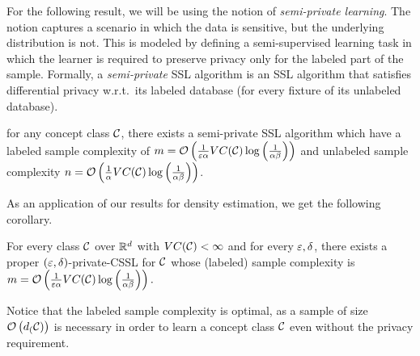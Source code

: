 \documentclass[12pt,a4paper,oneside,onecolumn]{book}
\begin{document}
For the following result, we will be using the notion of \emph{semi-private learning}.
The notion captures a scenario in which the data is sensitive, but the underlying distribution is not. This is modeled by defining a semi-supervised learning task in which the learner is required to preserve privacy only for the labeled part of the sample. Formally, a {\em semi-private} SSL algorithm is an SSL algorithm that satisfies differential privacy w.r.t.\ its labeled database (for every fixture of its unlabeled database).
\begin{theorem}
\label{thm:semi-private}
for any concept class $\mathcal{C}$,
there exists a semi-private SSL algorithm 
which have a labeled sample complexity of
$m = \mathcal{O}\left(\frac{1}{\varepsilon\alpha}VC(\mathcal{C})\log\left(\frac{1}{\alpha\beta}\right)\right)$ 
and unlabeled sample complexity 
$n = \mathcal{O}\left(\frac{1}{\alpha}VC(\mathcal{C})\log\left(\frac{1}{\alpha\beta}\right)\right)$.
\end{theorem}


As an application of our results for density estimation, we get the following corollary.
\begin{theorem}
\label{cor:ssl}
    For every class $\mathcal{C}$ over $\mathbb{R}^d$ with $VC(\mathcal{C})<\infty$ 
    and for every $\varepsilon,\delta$, 
    there exists a proper $(\varepsilon,\delta)$-private-CSSL for $\mathcal{C}$ whose (labeled) sample complexity is 
    $
    m = \mathcal{O}\left(\frac{1}{\varepsilon\alpha}VC(\mathcal{C})\log\left(\frac{1}{\alpha\beta}\right)\right).
    $
\end{theorem}

\begin{remark}
Notice that the labeled sample complexity is optimal, as a sample of size $\mathcal{O}\left(d_{(}\mathcal{C})\right)$ is necessary in order to learn a concept class $\mathcal{C}$ even 
without the privacy requirement.
\end{remark}
\end{document}
